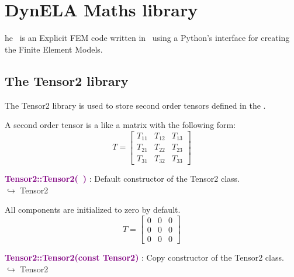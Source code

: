 %
%
%
\chapter{DynELA Maths library}

\startcontents[chapters]
\printmyminitoc[2]he \DynELA~is an Explicit FEM code written in \Cpp~using a Python's interface for creating the Finite Element Models. 

\section{The Tensor2 library}

The Tensor2 library is used to store second order tensors defined in the \DynELA.

A second order tensor is a like a matrix with the following form:
\begin{equation}
T=\left[\begin{array}{ccc}
  T_{11} & T_{12} & T_{13}\\
  T_{21} & T_{22} & T_{23}\\
  T_{31} & T_{32} & T_{33}
  \end{array}\right]
\end{equation}


\textcolor{purple}{\textbf{Tensor2::Tensor2(~)}}\label{Tensor2::Tensor2()} : Default constructor of the Tensor2 class.\\ \hspace*{5mm}$\hookrightarrow$ Tensor2

All components are initialized to zero by default.
\begin{equation*}
T=\left[\begin{array}{ccc}
0&0&0\\
0&0&0\\
0&0&0
\end{array}\right]
\end{equation*}

\textcolor{purple}{\textbf{Tensor2::Tensor2(const Tensor2)}}\label{Tensor2::Tensor2(const Tensor2)} : Copy constructor of the Tensor2 class.\\ \hspace*{5mm}$\hookrightarrow$ Tensor2


